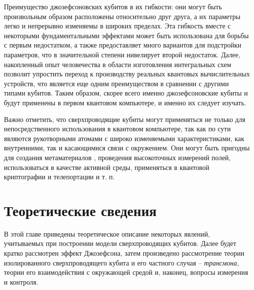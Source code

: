 \documentclass[12pt, twoside]{report}
\numberwithin{equation}{section}
\numberwithin{figure}{section}
\begin{document}
Преимущество джозефсоновских кубитов в их гибкости: они могут быть произвольным образом расположены относительно друг друга, а их параметры легко и непрерывно изменяемы в широких пределах. Эта гибкость вместе с некоторыми фундаментальными эффектами\cite{Koch2007} может быть использована для борьбы с первым недостатком, а также предоставляет много вариантов для подстройки параметров, что в значительной степени нивелирует второй недостаток. Далее, накопленный опыт человечества в области изготовления интегральных схем позволит упростить переход к производству реальных квантовых вычислительных устройств, что является еще одним преимуществом в сравнении с другими типами кубитов. Таким образом, скорее всего именно джозефсоновские кубиты и будут применены в первом квантовом компьютере, и именно их следует изучать.

Важно отметить, что сверхпроводящие кубиты могут применяться не только для непосредственного использования в квантовом компьютере, так как по сути являются рукотворными атомами с широко изменяемыми характеристиками, как внутренними, так и касающимися связи с окружением. Они могут быть пригодны для создания метаматериалов \cite{Macha2014}, проведения высокоточных измерений полей\cite{Clarke2006}, использоваться в качестве активной среды\cite{Astafiev2010}, применяться в квантовой криптографии и телепортации \cite{Xia2014} и т. п. 
\newpage



\chapter{Теоретические сведения} \label{chap:theory}
В этой главе приведены теоретическое описание некоторых явлений, учитываемых при построении модели сверхпроводящих кубитов. Далее будет кратко рассмотрен эффект Джозефсона, затем произведено рассмотрение теории изолированного сверхпроводящего кубита и его частного случая -- \textit{трансмона}, теории его взаимодействия с окружающей средой и, наконец, вопросы измерения и контроля. 

\iffalse
\end{document}
